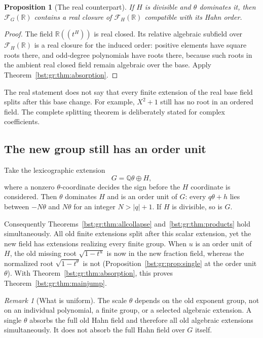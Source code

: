\documentclass[11pt,letterpaper]{article}
\newtheorem{proposition}[theorem]{Proposition}
\theoremstyle{definition}
\theoremstyle{remark}
\newtheorem{remark}[theorem]{Remark}
\newcommand{\Q}{\mathbb Q}
\newcommand{\R}{\mathbb R}
\newcommand{\HH}[2]{#1((t^{#2}))}
\newcommand{\FF}[2]{\mathcal F_{#2}(#1)}
\newcommand{\abs}[1]{\lvert #1\rvert}
\begin{document}
\begin{proposition}[The real counterpart]\label{bst:gr:prop:realclosure}
If $H$ is divisible and $\theta$ dominates it, then $\FF{\R}G$ contains a real
closure of $\FF{\R}H$ compatible with its Hahn order.
\end{proposition}
\begin{proof}
The field $\HH{\R}H$ is real closed. Its relative algebraic subfield over
$\FF{\R}H$ is a real closure for the induced order: positive elements have
square roots there, and odd-degree polynomials have roots there, because such
roots in the ambient real closed field remain algebraic over the base. Apply
Theorem~\ref{bst:gr:thm:absorption}.
\end{proof}

The real statement does not say that every finite extension of the real base
field splits after this base change. For example, $X^2+1$ still has no root
in an ordered field. The complete splitting theorem is deliberately stated
for complex coefficients.

\subsection{The new group still has an order unit}

Take the lexicographic extension
\[
 G=\Q\theta\oplus H,
\]
where a nonzero $\theta$-coordinate decides the sign before the $H$
coordinate is considered. Then $\theta$ dominates $H$ and is an order unit of
$G$: every $q\theta+h$ lies between $-N\theta$ and $N\theta$ for an integer
$N>\abs q+1$. If $H$ is divisible, so is $G$.

Consequently Theorems~\ref{bst:gr:thm:allcollapse}
and~\ref{bst:gr:thm:products} hold simultaneously. All old finite extensions
split after this scalar extension, yet the new field has extensions
realizing every finite group. When $u$ is an order unit of $H$, the old
missing root $\sqrt{1-t^u}$ is now in the new fraction field, whereas the
normalized root $\sqrt{1-t^\theta}$ is not (Proposition~\ref{bst:gr:prop:single}
at the order unit $\theta$). With Theorem~\ref{bst:gr:thm:absorption}, this
proves Theorem~\ref{bst:gr:thm:mainjump}.

\begin{remark}[What is uniform]\label{bst:gr:rem:uniform}
The scale $\theta$ depends on the old exponent group, not on an individual
polynomial, a finite group, or a selected algebraic extension. A single
$\theta$ absorbs the full old Hahn field and therefore all old algebraic
extensions simultaneously. It does not absorb the full Hahn field over $G$
itself.
\end{remark}
\end{document}
